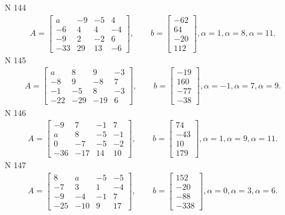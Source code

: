 \documentclass[11pt]{report}
\begin{document}
N 144
\begin{align*}
 A = \left[\begin{matrix}a & -9 & -5 & 4\\-6 & 4 & 4 & -4\\-9 & 2 & -2 & 6\\-33 & 29 & 13 & -6\end{matrix}\right],
    \qquad b = \left[\begin{matrix}-62\\64\\-20\\112\end{matrix}\right], \alpha = 1, \alpha = 8, \alpha = 11. 
 \end{align*}
N 145
\begin{align*}
 A = \left[\begin{matrix}a & 8 & 9 & -3\\-8 & 9 & -8 & 7\\-1 & -5 & 8 & -3\\-22 & -29 & -19 & 6\end{matrix}\right],
    \qquad b = \left[\begin{matrix}-19\\160\\-77\\-38\end{matrix}\right], \alpha = -1, \alpha = 7, \alpha = 9. 
 \end{align*}
N 146
\begin{align*}
 A = \left[\begin{matrix}-9 & 7 & -1 & 7\\a & 8 & -5 & -1\\0 & -7 & -5 & -2\\-36 & -17 & 14 & 10\end{matrix}\right],
    \qquad b = \left[\begin{matrix}74\\-43\\10\\179\end{matrix}\right], \alpha = 1, \alpha = 9, \alpha = 11. 
 \end{align*}
N 147
\begin{align*}
 A = \left[\begin{matrix}8 & a & -5 & -5\\-7 & 3 & 1 & -4\\-9 & -4 & -1 & 7\\-25 & -10 & 9 & 17\end{matrix}\right],
    \qquad b = \left[\begin{matrix}152\\-20\\-88\\-338\end{matrix}\right], \alpha = 0, \alpha = 3, \alpha = 6. 
 \end{align*}
\end{document}
